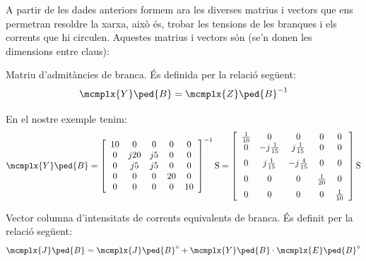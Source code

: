 A partir de les dades anteriors formem ara les diverses matrius i
vectors que ens permetran resoldre la xarxa, això és, trobar les
tensions de les branques i els corrents que hi circulen. Aquestes
matrius i vectors són (se'n donen les dimensions entre claus):

\begin{list}{}
{\setlength{\labelwidth}{20mm} \setlength{\leftmargin}{22mm} \setlength{\labelsep}{2mm}}
   \item[$\mcmplx{Y}\ped{B}\{b\times b\}$] Matriu d'admitàncies de branca. És definida per la relació següent:
   \begin{equation}
      \mcmplx{Y}\ped{B} = \mcmplx{Z}\ped{B}^{-1}
   \end{equation}

   En el nostre exemple tenim:
   \[
      \mcmplx{Y}\ped{B} = 
      \begin{bmatrix}\begin{array}{ccccc} 
            10 & 0 & 0 & 0 & 0 \\
            0 & j 20 & j 5 & 0 & 0 \\
            0 & j 5 & j 5 & 0 & 0 \\
            0 & 0 & 0 & 20 & 0 \\
            0 & 0 & 0 & 0 & 10
      \end{array}\end{bmatrix}^{-1}\unit{S} =
      \begin{bmatrix}\begin{array}{ccccc} 
            \frac{1}{10} & 0 & 0 & 0 & 0 \\
            0 & -j\frac{1}{15} & j\frac{1}{15} & 0 & 0 \\[2mm]
            0 & j\frac{1}{15} & -j\frac{4}{15} & 0 & 0 \\[2mm]
            0 & 0 & 0 & \frac{1}{20} & 0 \\[2mm]
            0 & 0 & 0 & 0 & \frac{1}{10}
      \end{array}\end{bmatrix}\unit{S}
   \]

   \item[$\mcmplx{J}\ped{B}\{b\}$] Vector columna d'intensitats de corrents  equivalents de branca. És definit per la relació següent:
   \begin{equation}
      \mcmplx{J}\ped{B} = \mcmplx{J}\ped{B}^\circ  + \mcmplx{Y}\ped{B} \cdot\mcmplx{E}\ped{B}^\circ
   \end{equation}


\end{list}
